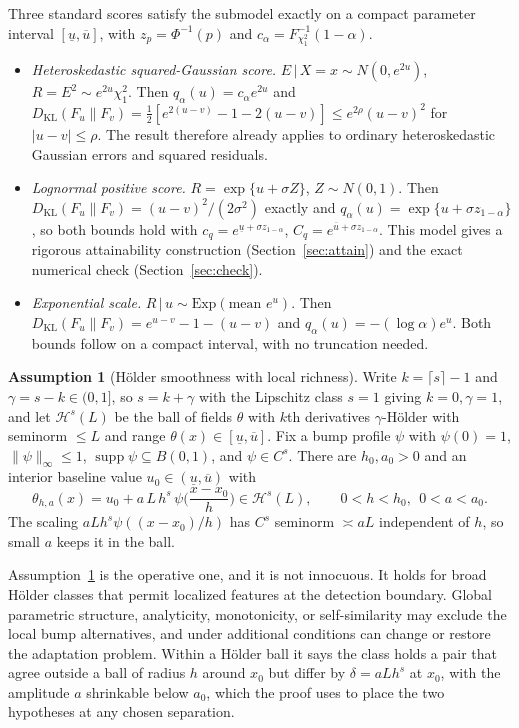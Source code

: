 \documentclass[11pt]{article}
\theoremstyle{definition}
\newtheorem{assumption}{Assumption}
\theoremstyle{remark}
\newcommand{\KL}{D_{\mathrm{KL}}}
\newcommand{\Hs}[1][s]{\mathcal{H}^{#1}}
\newcommand{\given}{\,|\,}
\begin{document}
Three standard scores satisfy the submodel exactly on a compact parameter interval
$[\underline u,\overline u]$, with $z_p=\Phi^{-1}(p)$ and $c_\alpha =
F^{-1}_{\chi^2_1}(1-\alpha)$.
\begin{itemize}
\item[(A)] \emph{Heteroskedastic squared-Gaussian score.} $E\given X=x \sim N(0,e^{2u})$,
  $R=E^2 \sim e^{2u}\chi^2_1$. Then $q_\alpha(u)=c_\alpha e^{2u}$ and
  $\KL(F_u\|F_v)=\tfrac12[e^{2(u-v)}-1-2(u-v)] \le e^{2\rho}(u-v)^2$ for $|u-v|\le\rho$. The
  result therefore already applies to ordinary heteroskedastic Gaussian errors and squared
  residuals.
\item[(B)] \emph{Lognormal positive score.} $R=\exp\{u+\sigma Z\}$, $Z\sim N(0,1)$. Then
  $\KL(F_u\|F_v)=(u-v)^2/(2\sigma^2)$ exactly and $q_\alpha(u)=\exp\{u+\sigma z_{1-\alpha}\}$,
  so both bounds hold with $c_q=e^{\underline u+\sigma z_{1-\alpha}}$,
  $C_q=e^{\overline u+\sigma z_{1-\alpha}}$. This model gives a rigorous attainability
  construction (Section~\ref{sec:attain}) and the exact numerical check (Section~\ref{sec:check}).
\item[(C)] \emph{Exponential scale.} $R\given u \sim \mathrm{Exp}(\text{mean }e^{u})$. Then
  $\KL(F_u\|F_v)=e^{u-v}-1-(u-v)$ and $q_\alpha(u)=-(\log\alpha)e^{u}$. Both bounds follow
  on a compact interval, with no truncation needed.
\end{itemize}

\begin{assumption}[H\"older smoothness with local richness]\label{as:holder}
Write $k=\lceil s\rceil-1$ and $\gamma=s-k\in(0,1]$, so $s=k+\gamma$ with the Lipschitz
class $s=1$ giving $k=0,\gamma=1$, and let $\Hs(L)$ be the ball of fields $\theta$ with
$k$th derivatives $\gamma$-H\"older with seminorm $\le L$ and range
$\theta(x)\in[\underline u,\overline u]$. Fix a bump profile $\psi$ with $\psi(0)=1$,
$\|\psi\|_\infty\le1$, $\operatorname{supp}\psi \subseteq B(0,1)$, and $\psi\in C^s$. There
are $h_0,a_0>0$ and an interior baseline value $u_0\in(\underline u,\overline u)$ with
\[
  \theta_{h,a}(x) = u_0 + a\,L\,h^{s}\,\psi\!\Big(\frac{x-x_0}{h}\Big) \in \Hs(L),
  \qquad 0<h<h_0,\ \ 0<a<a_0 .
\]
The scaling $a L h^{s}\psi((x-x_0)/h)$ has $C^s$ seminorm $\asymp a L$ independent of $h$,
so small $a$ keeps it in the ball.
\end{assumption}

Assumption~\ref{as:holder} is the operative one, and it is not innocuous. It holds for
broad H\"older classes that permit localized features at the detection boundary. Global
parametric structure, analyticity, monotonicity, or self-similarity may exclude the local
bump alternatives, and under additional conditions can change or restore the adaptation
problem. Within a H\"older
ball it says the class holds a pair that agree outside a ball of radius $h$ around $x_0$ but
differ by $\delta = a L h^{s}$ at $x_0$, with the amplitude $a$ shrinkable below $a_0$,
which the proof uses to place the two hypotheses at any chosen separation.
\end{document}
